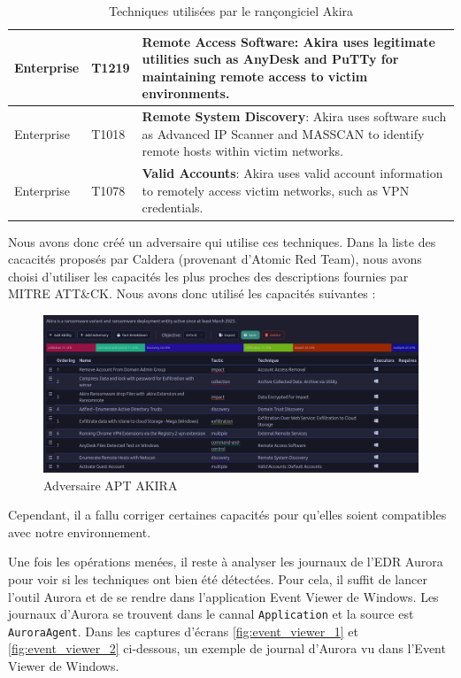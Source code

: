 \documentclass[12pt,letterpaper]{article}
\begin{document}
\begin{table}[h!]
\begin{tabular}{|l|l|p{10cm}|}
        Enterprise & T1219 & \textbf{Remote Access Software}: Akira uses legitimate utilities such as AnyDesk and PuTTy for maintaining remote access to victim environments. \\ \hline
        Enterprise & T1018 & \textbf{Remote System Discovery}: Akira uses software such as Advanced IP Scanner and MASSCAN to identify remote hosts within victim networks. \\ \hline
        Enterprise & T1078 & \textbf{Valid Accounts}: Akira uses valid account information to remotely access victim networks, such as VPN credentials. \\ \hline
    \end{tabular}
    \caption{Techniques utilisées par le rançongiciel Akira}
    \label{tab:akira_techniques}
\end{table}

Nous avons donc créé un adversaire qui utilise ces techniques.
Dans la liste des cacacités proposés par Caldera (provenant d'Atomic Red Team), nous avons choisi d'utiliser les capacités les plus proches des descriptions fournies par MITRE ATT\&CK.
Nous avons donc utilisé les capacités suivantes :

\begin{figure}[h!]
    \centering
    \includegraphics[width=1\textwidth]{images/caldera/akira_adversary.png}
    \caption{Adversaire APT AKIRA}
    \label{fig:akira_adversary}
\end{figure}

Cependant, il a fallu corriger certaines capacités pour qu'elles soient compatibles avec notre environnement. 

\bigskip

Une fois les opérations menées, il reste à analyser les journaux de l'EDR Aurora pour voir si les techniques ont bien été détectées.
Pour cela, il suffit de lancer l'outil Aurora et de se rendre dans l'application Event Viewer de Windows.
Les journaux d'Aurora se trouvent dans le cannal \verb|Application| et la source est \verb|AuroraAgent|.
Dans les captures d'écrans \ref{fig:event_viewer_1} et \ref{fig:event_viewer_2} ci-dessous, un exemple de journal d'Aurora vu dans l'Event Viewer de Windows.
\end{document}

